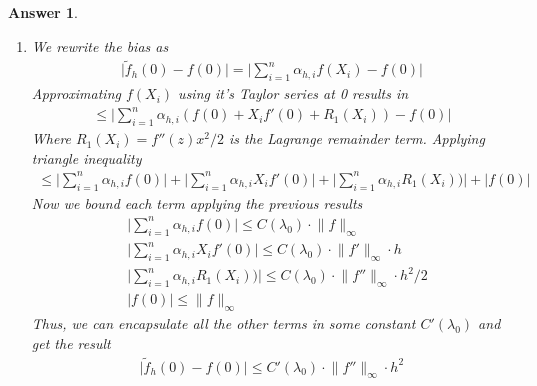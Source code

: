 \documentclass[12pt]{article}
\theoremstyle{colon}
\newtheorem*{answer}{Answer}
\begin{document}
\begin{answer}
\begin{enumerate}[label=\arabic*)]
    \item We rewrite the bias as
      \begin{gather*}
        \lvert \tilde{f}_h(0) - f(0) \rvert = \lvert \sum_{i=1}^n \alpha_{h,i} f(X_i) - f(0) \rvert
      \end{gather*}
      Approximating $f(X_i)$ using it's Taylor series at 0 results in
      \begin{gather*}
        \leq \lvert \sum_{i=1}^n \alpha_{h,i}( f(0) + X_i f'(0) + R_1(X_i) )- f(0) \rvert
      \end{gather*}
      Where $R_1(X_i) = f''(z)x^2/2$ is the Lagrange remainder term. Applying triangle inequality
      \begin{gather*}
        \leq \lvert \sum_{i=1}^n \alpha_{h,i}f(0) \rvert + \lvert \sum_{i=1}^n \alpha_{h,i} X_i f'(0) \rvert + \lvert \sum_{i=1}^n \alpha_{h,i}R_1(X_i) ) \rvert + \lvert f(0) \rvert
      \end{gather*}
      Now we bound each term applying the previous results
      \begin{align*}
        &\lvert \sum_{i=1}^n \alpha_{h,i}f(0) \rvert \leq C(\lambda_0) \cdot \lVert f \rVert_\infty \\
        &\lvert \sum_{i=1}^n \alpha_{h,i} X_i f'(0) \rvert \leq C(\lambda_0) \cdot \lVert f' \rVert_\infty \cdot h \\
        &\lvert \sum_{i=1}^n \alpha_{h,i}R_1(X_i) ) \rvert \leq C(\lambda_0) \cdot \lVert f'' \rVert_\infty \cdot h^2/2 \\
        &\lvert f(0) \rvert \leq \lVert f \rVert_\infty
      \end{align*}
      Thus, we can encapsulate all the other terms in some constant $C'(\lambda_0)$ and get the result
      \begin{gather*}
        \lvert \tilde{f}_h(0) - f(0) \rvert \leq C'(\lambda_0) \cdot \lVert f'' \rVert_\infty \cdot h^2
      \end{gather*}


\end{enumerate}
\end{answer}
\end{document}
